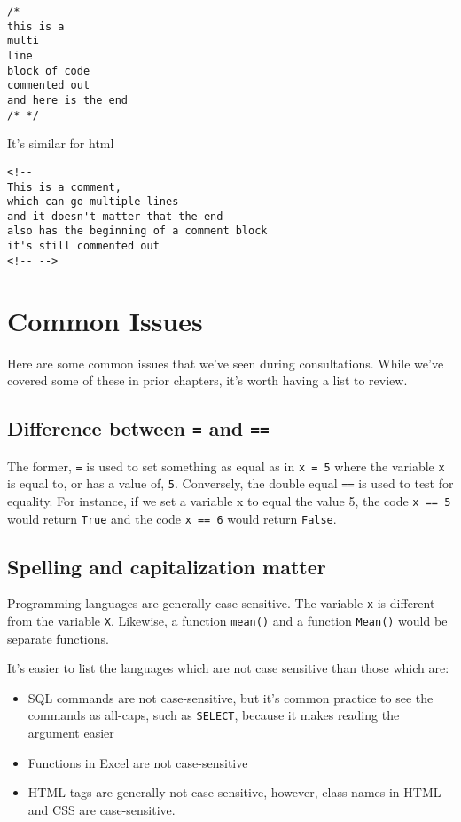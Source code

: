 \documentclass[
]{book}
\providecommand{\tightlist}{%
  \setlength{\itemsep}{0pt}\setlength{\parskip}{0pt}}
\begin{document}
\begin{verbatim}
/* 
this is a 
multi
line
block of code
commented out
and here is the end 
/* */
\end{verbatim}

It's similar for html

\begin{verbatim}
<!-- 
This is a comment, 
which can go multiple lines 
and it doesn't matter that the end
also has the beginning of a comment block
it's still commented out
<!-- -->
\end{verbatim}

\chapter{Common Issues}\label{common-issues}

Here are some common issues that we've seen during consultations. While we've covered some of these in prior chapters, it's worth having a list to review.

\section{\texorpdfstring{Difference between \texttt{=} and \texttt{==}}{Difference between = and ==}}\label{difference-between-and}

The former, \texttt{=} is used to set something as equal as in \texttt{x\ =\ 5} where
the variable \texttt{x} is equal to, or has a value of, \texttt{5}. Conversely, the
double equal \texttt{==} is used to test for equality. For instance, if we set
a variable x to equal the value 5, the code \texttt{x\ ==\ 5} would return \texttt{True}
and the code \texttt{x\ ==\ 6} would return \texttt{False}.\\

\section{Spelling and capitalization matter}\label{spelling-and-capitalization-matter}

Programming languages are generally case-sensitive. The variable \texttt{x} is
different from the variable \texttt{X}. Likewise, a
function \texttt{mean()} and a function \texttt{Mean()} would be separate functions.

It's easier to list the languages which are not case sensitive than those which are:

\begin{itemize}
\tightlist
\item
  SQL commands are not case-sensitive, but it's common practice to see the
  commands as all-caps, such as \texttt{SELECT}, because it makes reading the argument easier
\item
  Functions in Excel are not case-sensitive
\item
  HTML tags are generally not case-sensitive, however, class names in HTML and
  CSS are case-sensitive.
\end{itemize}
\end{document}
